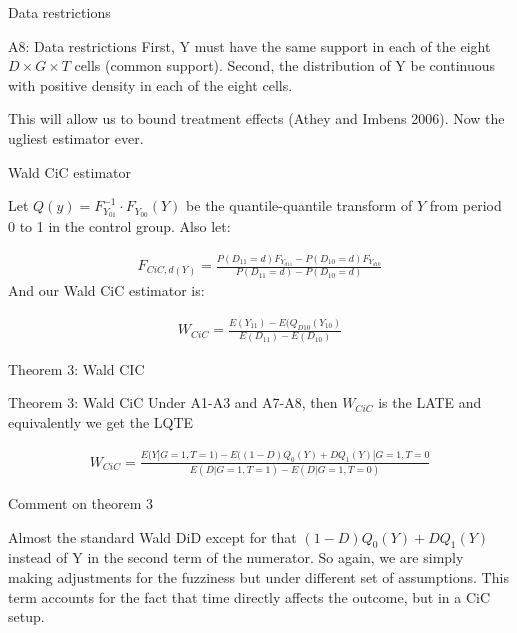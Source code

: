 \documentclass{beamer}
\begin{document}
\begin{frame}{Data restrictions}

\begin{block}{A8: Data restrictions}
First, Y must have the same support in each of the eight $D \times G \times T$ cells (common support).  Second, the distribution of Y be continuous with positive density in each of the eight cells.
\end{block}

This will allow us to bound treatment effects (Athey and Imbens 2006). Now the ugliest estimator ever.

\end{frame}

\begin{frame}{Wald CiC estimator}

Let $Q(y) = F_{Y_{01}}^{-1} \cdot F_{Y_{00}}(Y)$ be the quantile-quantile transform of $Y$ from period 0 to 1 in the control group.  Also let:

\begin{eqnarray*}
F_{CiC,d(Y)} = \frac{
P(D_{11}=d) F_{Y_{d11}} - 
P(D_{10}=d) F_{Y_{d10}}}{
P(D_{11}=d) - P(D_{10}=d)}
\end{eqnarray*}And our Wald CiC estimator is:

\begin{eqnarray*}
W_{CiC} = \frac{
E(Y_{11}) - E(Q_{D10}(Y_{10})}
{E(D_{11}) - E(D_{10})}
\end{eqnarray*}

\end{frame}

\begin{frame}{Theorem 3: Wald CIC}

\begin{block}{Theorem 3: Wald CiC}
Under A1-A3 and A7-A8, then $W_{CiC}$ is the LATE and equivalently we get the LQTE
\end{block}

\footnotesize
\begin{eqnarray*}
W_{CiC} = \frac{
E(Y|G=1,T=1) - 
E((1-D)Q_0(Y) + DQ_1(Y) | G=1, T=0}{
E(D|G=1,T=1) - E(D|G=1,T=0)}
\end{eqnarray*}

\end{frame}

\begin{frame}{Comment on theorem 3}

Almost the standard Wald DiD except for that $(1-D)Q_0(Y) + DQ_1(Y)$ instead of Y in the second term of the numerator.  So again, we are simply making adjustments for the fuzziness but under different set of assumptions. This term accounts for the fact that time directly affects the outcome, but in a CiC setup.

\end{frame}
\end{document}
